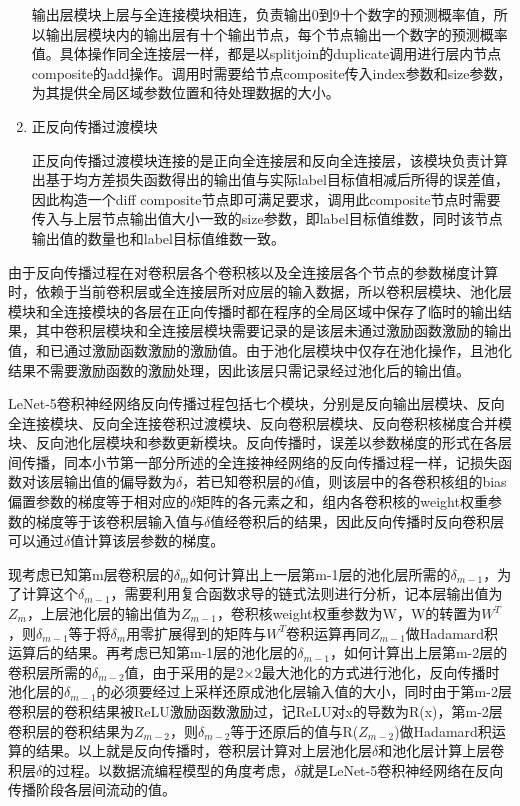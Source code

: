 \begin{enumerate}
输出层模块上层与全连接模块相连，负责输出0到9十个数字的预测概率值，所以输出层模块内的输出层有十个输出节点，每个节点输出一个数字的预测概率值。具体操作同全连接层一样，都是以splitjoin的duplicate调用进行层内节点composite的add操作。调用时需要给节点composite传入index参数和size参数，为其提供全局区域参数位置和待处理数据的大小。

\item 正反向传播过渡模块

正反向传播过渡模块连接的是正向全连接层和反向全连接层，该模块负责计算出基于均方差损失函数得出的输出值与实际label目标值相减后所得的误差值，因此构造一个diff composite节点即可满足要求，调用此composite节点时需要传入与上层节点输出值大小一致的size参数，即label目标值维数，同时该节点输出值的数量也和label目标值维数一致。
\end{enumerate}

由于反向传播过程在对卷积层各个卷积核以及全连接层各个节点的参数梯度计算时，依赖于当前卷积层或全连接层所对应层的输入数据，所以卷积层模块、池化层模块和全连接模块的各层在正向传播时都在程序的全局区域中保存了临时的输出结果，其中卷积层模块和全连接层模块需要记录的是该层未通过激励函数激励的输出值，和已通过激励函数激励的激励值。由于池化层模块中仅存在池化操作，且池化结果不需要激励函数的激励处理，因此该层只需记录经过池化后的输出值。

LeNet-5卷积神经网络反向传播过程包括七个模块，分别是反向输出层模块、反向全连接模块、反向全连接卷积过渡模块、反向卷积层模块、反向卷积核梯度合并模块、反向池化层模块和参数更新模块。反向传播时，误差以参数梯度的形式在各层间传播，同本小节第一部分所述的全连接神经网络的反向传播过程一样，记损失函数对该层输出值的偏导数为$\delta$，若已知卷积层的$\delta$值，则该层中的各卷积核组的bias偏置参数的梯度等于相对应的$\delta$矩阵的各元素之和，组内各卷积核的weight权重参数的梯度等于该卷积层输入值与$\delta$值经卷积后的结果，因此反向传播时反向卷积层可以通过$\delta$值计算该层参数的梯度。

现考虑已知第m层卷积层的$\delta _{m}$如何计算出上一层第m-1层的池化层所需的$\delta _{m - 1}$，为了计算这个$\delta _{m - 1}$，需要利用复合函数求导的链式法则进行分析，记本层输出值为$Z _{m}$，上层池化层的输出值为$Z _{m - 1}$，卷积核weight权重参数为W，W的转置为$W ^{T}$，则$\delta _{m - 1}$等于将$\delta _{m}$用零扩展得到的矩阵与$W ^{T}$卷积运算再同$Z _{m - 1}$做Hadamard积运算后的结果。再考虑已知第m-1层的池化层的$\delta _{m - 1}$，如何计算出上层第m-2层的卷积层所需的$\delta _{m - 2}$值，由于采用的是2×2最大池化的方式进行池化，反向传播时池化层的$\delta _{m - 1}$的必须要经过上采样还原成池化层输入值的大小，同时由于第m-2层卷积层的卷积结果被ReLU激励函数激励过，记ReLU对x的导数为R(x)，第m-2层卷积层的卷积结果为$Z _{m - 2}$，则$\delta _{m - 2}$等于还原后的值与R($Z _{m - 2}$)做Hadamard积运算的结果。以上就是反向传播时，卷积层计算对上层池化层$\delta$和池化层计算上层卷积层$\delta$的过程。以数据流编程模型的角度考虑，$\delta$就是LeNet-5卷积神经网络在反向传播阶段各层间流动的值。

